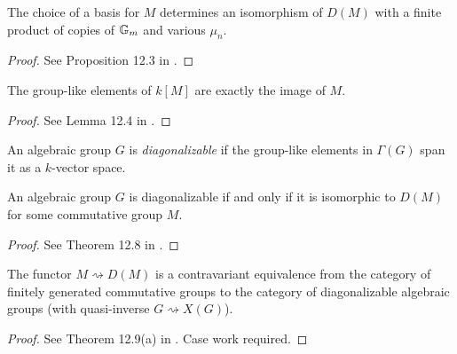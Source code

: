 \begin{proposition}
  \label{DM_struct}
  The choice of a basis for $M$ determines an isomorphism of $D(M)$
  with a finite product of copies of ${\mathbb G_m}$ and various $\mu_n$.
\end{proposition}
\begin{proof}
  See Proposition 12.3 in \cite{Milne_2017}.
\end{proof}


\begin{lemma}
  \label{0-grp-like_in_kM}
  The group-like elements of $k[M]$ are exactly the image of $M$.
\end{lemma}
\begin{proof}
  See Lemma 12.4 in \cite{Milne}.
\end{proof}


\begin{definition}
  \label{diag}
  An algebraic group $G$ is \emph{diagonalizable}
  if the group-like elements in $\Gamma(G)$ span it as a $k$-vector space.
\end{definition}

\begin{theorem}
  \label{diag_iff_D}
  An algebraic group $G$ is diagonalizable
  if and only if it is isomorphic to $D(M)$ for some commutative group $M$.
\end{theorem}
\begin{proof}
  See Theorem 12.8 in \cite{Milne_2017}.
\end{proof}

\begin{theorem}
  \label{congr_fggrp_diag}
  The functor $M\rightsquigarrow D(M)$ is a contravariant equivalence
  from the category of finitely generated commutative groups to the category of
  diagonalizable algebraic groups (with quasi-inverse $G \rightsquigarrow X(G)$).
\end{theorem}
\begin{proof}
  See Theorem 12.9(a) in \cite{Milne_2017}. Case work required.
\end{proof}
